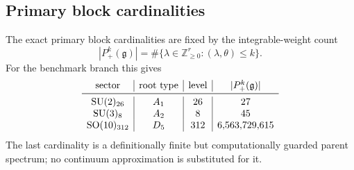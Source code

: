 \documentclass[11pt]{article}
\newcommand{\SO}{\mathrm{SO}}
\newcommand{\SU}{\mathrm{SU}}
\begin{document}
\subsection{Primary block cardinalities}
The exact primary block cardinalities are fixed by the integrable-weight count
\begin{equation}
  |P_+^k(\mathfrak{g})|
  =\#\{\lambda\in\mathbb{Z}_{\ge0}^{r}:(\lambda,\theta)\le k\}.
\end{equation}
For the benchmark branch this gives
\begin{equation}
\begin{array}{c|c|c|c}
\text{sector} & \text{root type} & \text{level} & |P_+^k(\mathfrak{g})| \\
\midrule
\SU(2)_{\benchmarkLeptonLevel} & A_1 & \benchmarkLeptonLevel & 27 \\
\SU(3)_{\benchmarkQuarkLevel} & A_2 & \benchmarkQuarkLevel & 45 \\
\SO(10)_{\benchmarkParentLevel} & D_5 & \benchmarkParentLevel & 6{,}563{,}729{,}615
\end{array}
\label{eq:primary-cardinalities}
\end{equation}
The last cardinality is a definitionally finite but computationally guarded parent spectrum; no continuum approximation is substituted for it.
\end{document}
